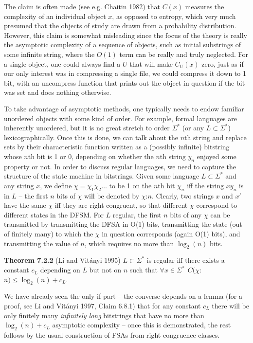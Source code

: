 The claim is often made (see e.g.  Chaitin 1982) that $C(x)$ measures the
complexity of an individual object $x$, as opposed to entropy, which very much
presumed that the objects of study are drawn from a probability
distribution. However, this claim is somewhat misleading since the focus of
the theory is really the asymptotic complexity of a sequence of objects, such
as initial substrings of some infinite string, where the $O(1)$ term can be
really and truly neglected.  For a single object, one could always find a $U$
that will make $C_U(x)$ zero, just as if our only interest was in compressing
a single file, we could compress it down to 1 bit, with an uncompress function
that prints out the object in question if the bit was set and does nothing
otherwise.\nocite{Chaitin:1982}

To take advantage of asymptotic methods, one typically needs to endow familiar
unordered objects with some kind of order. For example, formal languages are
inherently unordered, but it is no great stretch to order $\Sigma^*$ (or any
$L \subset \Sigma^*$) lexicographically.  Once this is done, we can talk about
the $n$th string and replace sets by their characteristic function written as
a (possibly infinite) bitstring whose $n$th bit is 1 or 0, depending on
whether the $n$th string $y_n$ enjoyed some property or not. In order to
discuss regular languages, we need to capture the structure of the state
machine in bitstrings. Given some language $L \subset \Sigma^*$ and any string
$x$, we define $\chi = \chi_1\chi_2\ldots$ to be 1 on the $n$th bit $\chi_n$
iff the string $xy_n$ is in $L$ -- the first $n$ bits of $\chi$ will be
denoted by $\chi$:$n$. Clearly, two strings $x$ and $x'$ have the same $\chi$
iff they are right congruent, so that different $\chi$ correspond to different
states in the DFSM. For $L$ regular, the first $n$ bits of any $\chi$ can be
transmitted by transmitting the DFSA in O(1) bits, transmitting the state (out
of finitely many) to which the $\chi$ in question corresponds (again O(1)
bits), and transmitting the value of $n$, which requires no more than
$\log_2(n)$ bits.

\smallskip\noindent
{\bf Theorem 7.2.2} (Li and Vit\'anyi 1995) $L \subset \Sigma^*$ is regular iff
there exists a constant $c_L$ depending on $L$ but not on $n$ such that
$\forall x \in \Sigma^* \ \  C(\chi$:$n) \leq \log_2 (n) + c_L$. 

\smallskip{} We have already seen the only if part --
the converse depends on a lemma (for a proof, see Li and Vit\'anyi 1997, Claim
6.8.1) that for any constant $c_L$ there will be only finitely many {\it
  infinitely long} bitstrings that have no more than $\log_2 (n) + c_L$
asymptotic complexity -- once this is demonstrated, the rest follows by the
usual construction of FSAs from right congruence classes.
\nocite{Li:1995}\nocite{Li:1997}

